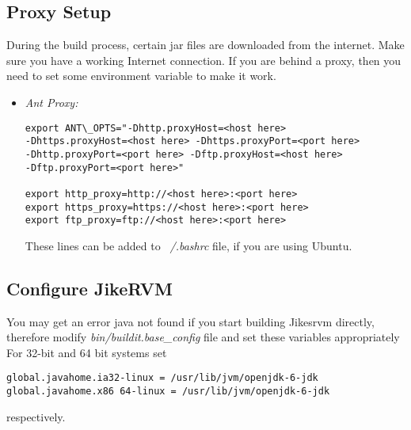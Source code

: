 \documentclass[a4paper]{article}
\begin{document}
\subsection{Proxy Setup}
During the build process, certain jar files are downloaded from the internet. Make sure you have a working Internet connection. If you are behind a proxy, then you need to set some environment variable to make it work.
\begin{itemize}
\item \textit{Ant Proxy:}
\begin{verbatim}
export ANT\_OPTS="-Dhttp.proxyHost=<host here>
-Dhttps.proxyHost=<host here> -Dhttps.proxyPort=<port here>
-Dhttp.proxyPort=<port here> -Dftp.proxyHost=<host here>
-Dftp.proxyPort=<port here>"

export http_proxy=http://<host here>:<port here>
export https_proxy=https://<host here>:<port here>
export ftp_proxy=ftp://<host here>:<port here>
\end{verbatim}
These lines can be added to \textit{~/.bashrc} file, if you are using Ubuntu.
\end{itemize}

\subsection{Configure JikeRVM}
You may get an error java not found if you start building Jikesrvm directly, therefore modify \textit{bin/buildit.base\_config} file and set these variables appropriately\\
For 32-bit and 64 bit systems set 
\begin{verbatim}
global.javahome.ia32-linux = /usr/lib/jvm/openjdk-6-jdk
global.javahome.x86 64-linux = /usr/lib/jvm/openjdk-6-jdk
\end{verbatim}
respectively.
\end{document}
